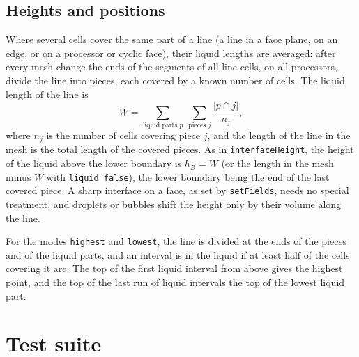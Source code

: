 \documentclass[11pt,a4paper]{article}
\newcommand{\iH}{\texttt{interfaceHeight}}
\begin{document}
\subsection{Heights and positions}
\label{sec:heights}
Where several cells cover the same part of a line (a line in a face plane, on
an edge, or on a processor or cyclic face), their liquid lengths are
averaged: after every mesh change the ends of the segments of all line cells,
on all processors, divide the line into pieces, each covered by a known
number of cells. The liquid length of the line is
\begin{equation}
  W = \sum_{\text{liquid parts } p}\ \sum_{\text{pieces } j}
      \frac{|p \cap j|}{n_j},
\end{equation}
where $n_j$ is the number of cells covering piece $j$, and the length of the
line in the mesh is the total length of the covered pieces. As in \iH{}, the
height of the liquid above the lower boundary is $h_B = W$ (or the length in
the mesh minus $W$ with \texttt{liquid false}), the lower boundary being the
end of the last covered piece. A sharp interface on a face, as set by
\texttt{setFields}, needs no special treatment, and droplets or bubbles shift
the height only by their volume along the line.

For the modes \texttt{highest} and \texttt{lowest}, the line is divided at the
ends of the pieces and of the liquid parts, and an interval is in the liquid
if at least half of the cells covering it are. The top of the first liquid
interval from above gives the highest point, and the top of the last run of
liquid intervals the top of the lowest liquid part.

\section{Test suite}
\label{sec:tests}
\end{document}
